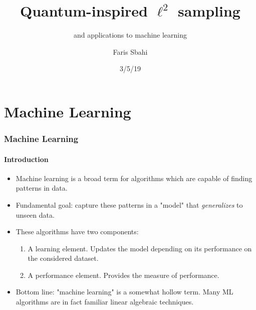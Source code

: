 \documentclass{beamer}
\title{Quantum-inspired $\ell^2$ sampling}
\subtitle{and applications to machine learning}
\author[Sbahi] %
{Faris Sbahi}
\date{3/5/19}
\newcommand\0{\mathbf{0}}
\newcommand\<{\langle}
\renewcommand\>{\rangle}
\begin{document}
\maketitle


\section{Machine Learning}

\begin{frame}
    \frametitle{Machine Learning}
    \framesubtitle{Introduction}
    \begin{itemize}
    \item Machine learning is a broad term for algorithms which are capable of finding patterns in data.
    \item Fundamental goal: capture these patterns in a "model" that \textit{generalizes} to unseen data.
    \item These algorithms have two components:
    \begin{enumerate}
    \item A learning element. Updates the model depending on its performance on the considered dataset.
    \item A performance element. Provides the measure of performance.
    \end{enumerate}
	\item Bottom line: "machine learning" is a somewhat hollow term. Many ML algorithms are in fact familiar linear algebraic techniques.
    \end{itemize}
    \end{frame}
\end{document}
